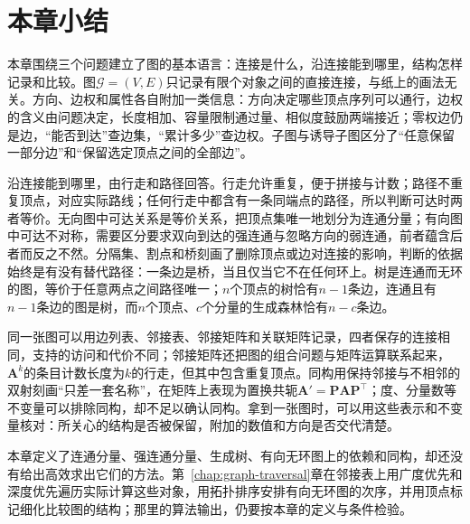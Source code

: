 \section{本章小结}
\label{sec:graph-objects-summary}

本章围绕三个问题建立了图的基本语言：连接是什么，沿连接能到哪里，结构怎样记录和比较。图$\mathcal G=(V,E)$只记录有限个对象之间的直接连接，与纸上的画法无关。方向、边权和属性各自附加一类信息：方向决定哪些顶点序列可以通行，边权的含义由问题决定，长度相加、容量限制通过量、相似度鼓励两端接近；零权边仍是边，“能否到达”查边集，“累计多少”查边权。子图与诱导子图区分了“任意保留一部分边”和“保留选定顶点之间的全部边”。

沿连接能到哪里，由行走和路径回答。行走允许重复，便于拼接与计数；路径不重复顶点，对应实际路线；任何行走中都含有一条同端点的路径，所以判断可达时两者等价。无向图中可达关系是等价关系，把顶点集唯一地划分为连通分量；有向图中可达不对称，需要区分要求双向到达的强连通与忽略方向的弱连通，前者蕴含后者而反之不然。分隔集、割点和桥刻画了删除顶点或边对连接的影响，判断的依据始终是有没有替代路径：一条边是桥，当且仅当它不在任何环上。树是连通而无环的图，等价于任意两点之间路径唯一；$n$个顶点的树恰有$n-1$条边，连通且有$n-1$条边的图是树，而$n$个顶点、$c$个分量的生成森林恰有$n-c$条边。

同一张图可以用边列表、邻接表、邻接矩阵和关联矩阵记录，四者保存的连接相同，支持的访问和代价不同；邻接矩阵还把图的组合问题与矩阵运算联系起来，$\bm A^k$的条目计数长度为$k$的行走，但其中包含重复顶点。同构用保持邻接与不相邻的双射刻画“只差一套名称”，在矩阵上表现为置换共轭$\bm A'=\bm P\bm A\bm P^{\top}$；度、分量数等不变量可以排除同构，却不足以确认同构。拿到一张图时，可以用这些表示和不变量核对：所关心的结构是否被保留，附加的数值和方向是否交代清楚。

本章定义了连通分量、强连通分量、生成树、有向无环图上的依赖和同构，却还没有给出高效求出它们的方法。第~\ref{chap:graph-traversal}章在邻接表上用广度优先和深度优先遍历实际计算这些对象，用拓扑排序安排有向无环图的次序，并用顶点标记细化比较图的结构；那里的算法输出，仍要按本章的定义与条件检验。

